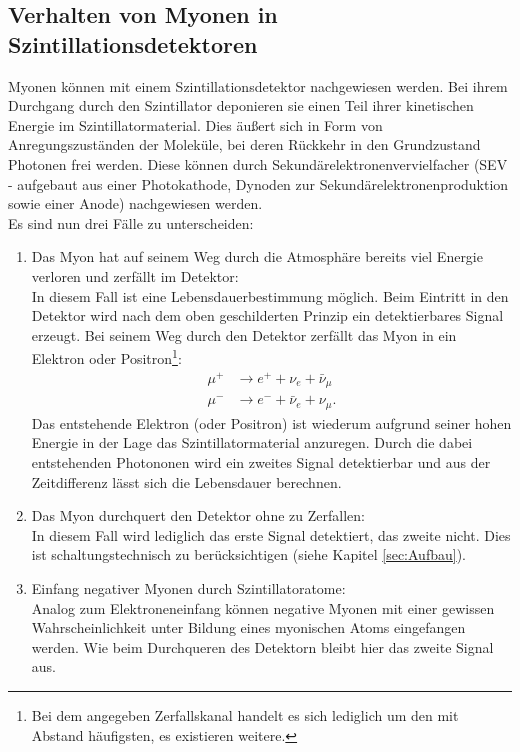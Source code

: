   \subsection{Verhalten von Myonen in Szintillationsdetektoren}
  Myonen können mit einem Szintillationsdetektor nachgewiesen werden. Bei ihrem Durchgang
  durch den Szintillator deponieren sie einen Teil ihrer kinetischen Energie im Szintillatormaterial.
  Dies äußert sich in Form von Anregungszuständen der Moleküle, bei deren Rückkehr in
  den Grundzustand Photonen frei werden. Diese können durch Sekundärelektronenvervielfacher
  (SEV - aufgebaut aus einer Photokathode, Dynoden zur Sekundärelektronenproduktion sowie
  einer Anode) nachgewiesen werden.\\
  Es sind nun drei Fälle zu unterscheiden:
    \begin{enumerate}
    \item Das Myon hat auf seinem Weg durch die Atmosphäre bereits viel Energie
    verloren und zerfällt im Detektor:\\
    In diesem Fall ist eine Lebensdauerbestimmung möglich. Beim Eintritt in den Detektor
    wird nach dem oben geschilderten Prinzip ein detektierbares Signal erzeugt. Bei
    seinem Weg durch den Detektor zerfällt das Myon in ein Elektron oder Positron\footnote{
    Bei dem angegeben Zerfallskanal handelt es sich lediglich um den mit Abstand häufigsten,
    es existieren weitere.}:
    \begin{align*}
      \mu^+ &\to e^+ + \nu_{e} + \bar{\nu}_{\mu}\\
      \mu^- &\to e^- + \bar{\nu}_{e} +  \nu_{\mu}.
    \end{align*}
    Das entstehende Elektron (oder Positron) ist wiederum  aufgrund seiner hohen Energie
    in der Lage das Szintillatormaterial anzuregen.
    Durch die dabei entstehenden Photononen wird ein zweites Signal detektierbar
    und aus der Zeitdifferenz lässt sich die Lebensdauer berechnen.
    \item Das Myon durchquert den Detektor ohne zu Zerfallen:\\
    In diesem Fall wird lediglich das erste Signal detektiert, das zweite nicht.
    Dies ist schaltungstechnisch zu berücksichtigen (siehe Kapitel \ref{sec:Aufbau}).
    \item Einfang negativer Myonen durch Szintillatoratome:\\
    Analog zum Elektroneneinfang können negative Myonen mit einer gewissen Wahrscheinlichkeit
    unter Bildung eines myonischen Atoms eingefangen werden. Wie beim Durchqueren
    des Detektorn bleibt hier das zweite Signal aus.
    \end{enumerate}
